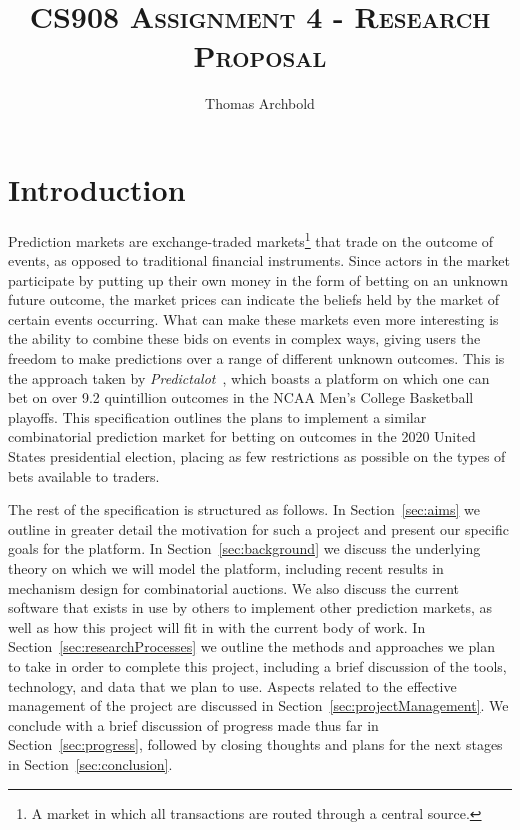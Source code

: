 \documentclass[10pt,a4paper]{article}
\title{\textsc{CS908 Assignment 4 - Research Proposal}}
\author{Thomas Archbold}
\date{}
\theoremstyle{plain}
\theoremstyle{definition}
\begin{document}
\maketitle



\section{Introduction}

Prediction markets are exchange-traded markets\footnote{A market in which all
transactions are routed through a central source.} that trade on the outcome of
events, as opposed to traditional financial instruments. Since actors in the
market participate by putting up their own money in the form of betting on an
unknown future outcome, the market prices can indicate the beliefs held by the
market of certain events occurring. What can make these markets even more
interesting is the ability to combine these bids on events in complex ways,
giving users the freedom to make predictions over a range of different unknown
outcomes. This is the approach taken by \emph{Predictalot}~\cite{Predictalot},
which boasts a platform on which one can bet on over 9.2 quintillion outcomes
in the NCAA Men's College Basketball playoffs. This specification outlines the
plans to implement a similar combinatorial prediction market for betting on
outcomes in the 2020 United States presidential election, placing as few
restrictions as possible on the types of bets available to traders.

The rest of the specification is structured as follows. In
Section~\ref{sec:aims} we outline in greater detail the motivation for such a
project and present our specific goals for the platform. In
Section~\ref{sec:background} we discuss the underlying theory on which we will
model the platform, including recent results in mechanism design for
combinatorial auctions. We also discuss the current software that exists in use
by others to implement other prediction markets, as well as how this project
will fit in with the current body of work.  In
Section~\ref{sec:researchProcesses} we outline the methods and approaches we
plan to take in order to complete this project, including a brief discussion of
the tools, technology, and data that we plan to use. Aspects related to the
effective management of the project are discussed in
Section~\ref{sec:projectManagement}. We conclude with a brief discussion of
progress made thus far in Section~\ref{sec:progress}, followed by closing
thoughts and plans for the next stages in Section~\ref{sec:conclusion}.
\end{document}
